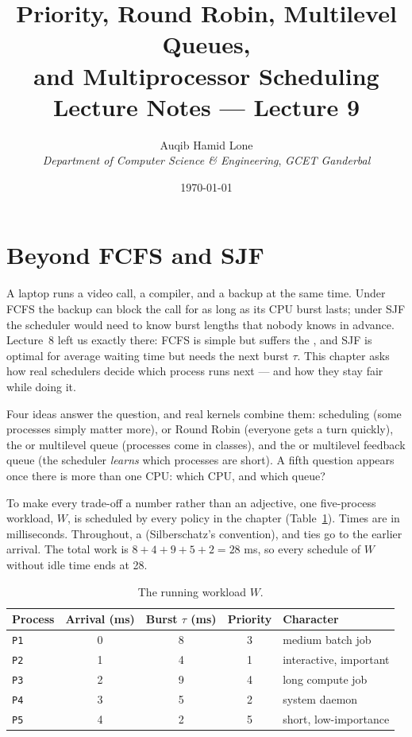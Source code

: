 \documentclass[11pt]{article}
\title{Priority, Round Robin, Multilevel Queues,\\and Multiprocessor Scheduling\\\large Lecture Notes --- Lecture 9}
\author{Auqib Hamid Lone\\[0.3em]
  \emph{Department of Computer Science \& Engineering}, \emph{GCET Ganderbal}}
\date{\today}
\begin{document}
\maketitle

\section{Beyond FCFS and SJF}

\noindent{}

\medskip
A laptop runs a video call, a compiler, and a backup at the same time. Under FCFS the backup can block the call for as long as its CPU burst lasts; under SJF the scheduler would need to know burst lengths that nobody knows in advance. Lecture~8 left us exactly there: FCFS is simple but suffers the , and SJF is optimal for average waiting time but needs the next burst $\tau$. This chapter asks how real schedulers decide which process runs next --- and how they stay fair while doing it.

Four ideas answer the question, and real kernels combine them:  scheduling (some processes simply matter more),  or Round Robin (everyone gets a turn quickly), the  or multilevel queue (processes come in classes), and the  or multilevel feedback queue (the scheduler \emph{learns} which processes are short). A fifth question appears once there is more than one CPU: which CPU, and which queue?

To make every trade-off a number rather than an adjective, one five-process workload, $W$, is scheduled by every policy in the chapter (Table~\ref{tab:W}). Times are in milliseconds. Throughout, a  (Silberschatz's convention), and ties go to the earlier arrival. The total work is $8+4+9+5+2 = 28$ ms, so every schedule of $W$ without idle time ends at 28.

\begin{table}[h]
\centering
\renewcommand{\arraystretch}{1.2}
\begin{tabular}{lcccl}
  \textbf{Process} & \textbf{Arrival (ms)} & \textbf{Burst $\tau$ (ms)} & \textbf{Priority} & \textbf{Character} \\ \hline
  \texttt{P1} & 0 & 8 & 3 & medium batch job \\
  \texttt{P2} & 1 & 4 & 1 & interactive, important \\
  \texttt{P3} & 2 & 9 & 4 & long compute job \\
  \texttt{P4} & 3 & 5 & 2 & system daemon \\
  \texttt{P5} & 4 & 2 & 5 & short, low-importance \\
\end{tabular}
\caption{The running workload $W$.}
\label{tab:W}
\end{table}
\end{document}

